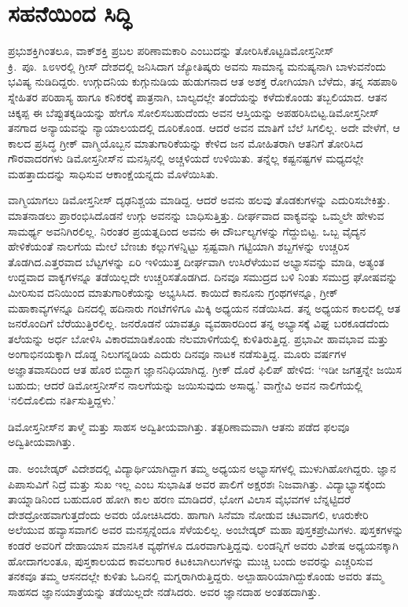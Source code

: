 \section*{ಸಹನೆಯಿಂದ ಸಿದ್ಧಿ}


ಪ್ರಭುಶಕ್ತಿಗಿಂತಲೂ, ವಾಕ್​ಶಕ್ತಿ ಪ್ರಬಲ ಪರಿಣಾಮಕಾರಿ ಎಂಬುದನ್ನು ತೋರಿಸಿಕೊಟ್ಟ\break ಡಿಮೋಸ್ತನೀಸ್ ಕ್ರಿ.\ ಪೂ.\ ೩೮೪ರಲ್ಲಿ ಗ್ರೀಸ್ ದೇಶದಲ್ಲಿ ಜನಿಸಿದಾಗ ಜ್ಯೋತಿಷ್ಕರು ಅವನು ಸಾಮಾನ್ಯ ಮನುಷ್ಯನಾಗಿ ಬಾಳುವನೆಂದು ಭವಿಷ್ಯ ನುಡಿದಿದ್ದರು. ಉಗ್ಗುದನಿಯ ಕುಗ್ಗುನುಡಿಯ ಹುಡುಗನಾದ ಆತ ಅಶಕ್ತ ರೋಗಿಯಾಗಿ ಬೆಳೆದು, ತನ್ನ ಸಹಪಾಠಿ ಸ್ನೇಹಿತರ ಪರಿಹಾಸ್ಯ ಹಾಗೂ ಕನಿಕರಕ್ಕೆ ಪಾತ್ರನಾಗಿ, ಬಾಲ್ಯದಲ್ಲೇ ತಂದೆಯನ್ನು ಕಳೆದುಕೊಂಡು ತಬ್ಬಲಿಯಾದ. ಆತನ ಚಿಕ್ಕಪ್ಪ ಈ ಬೆಪ್ಪುತಕ್ಕಡಿಯನ್ನು ಹೇಗೊ ಸೋಲಿಸಬಹುದೆಂದು ಅವನ ಆಸ್ತಿಯನ್ನು ಅಪಹರಿಸಿಬಿಟ್ಟ.\break ಡಿಮೋಸ್ತನೀಸ್ ತನಗಾದ ಅನ್ಯಾಯವನ್ನು ನ್ಯಾಯಾಲಯದಲ್ಲಿ ದೂರಿಕೊಂಡ. ಆದರೆ ಅವನ ಮಾತಿಗೆ ಬೆಲೆ ಸಿಗಲಿಲ್ಲ. ಅದೇ ವೇಳೆಗೆ, ಆ ಕಾಲದ ಪ್ರಸಿದ್ಧ ಗ್ರೀಕ್ ವಾಗ್ಮಿಯೊಬ್ಬನ ಮಾತುಗಾರಿಕೆಯನ್ನು ಕೇಳಿದ ಜನ ಮೋಹಿತರಾಗಿ ಆತನಿಗೆ ತೋರಿಸಿದ ಗೌರವಾದರಗಳು ಡಿಮೋಸ್ತನೀಸ್​ನ ಮನಸ್ಸಿನಲ್ಲಿ ಅಚ್ಚಳಿಯದೆ ಉಳಿಯಿತು. ತನ್ನೆಲ್ಲ ಕಷ್ಟನಷ್ಟಗಳ ಮಧ್ಯದಲ್ಲೇ ಮಹತ್ತಾದುದನ್ನು ಸಾಧಿಸುವ ಆಕಾಂಕ್ಷೆಯನ್ನದು ಮೊಳೆಯಿಸಿತು.

ವಾಗ್ಮಿಯಾಗಲು ಡಿಮೋಸ್ತನೀಸ್ ದೃಢನಿಶ್ಚಯ ಮಾಡಿದ್ದ. ಆದರೆ ಅವನು ಹಲವು ತೊಡಕುಗಳನ್ನು ಎದುರಿಸಬೇಕಿತ್ತು. ಮಾತನಾಡಲು ಪ್ರಾರಂಭಿಸಿದೊಡನೆ ಉಗ್ಗು ಅವನನ್ನು ಬಾಧಿಸುತ್ತಿತ್ತು. ದೀರ್ಘವಾದ ವಾಕ್ಯವನ್ನು ಒಮ್ಮಲೇ ಹೇಳುವ ಸಾಮರ್ಥ್ಯ ಅವನಿಗಿರಲಿಲ್ಲ. ನಿರಂತರ ಪ್ರಯತ್ನದಿಂದ ಅವನು ಈ ದೌರ್ಬಲ್ಯಗಳನ್ನು ಗೆದ್ದುಬಿಟ್ಟ. ಒಬ್ಬ ವೈದ್ಯನ ಹೇಳಿಕೆಯಂತೆ ನಾಲಗೆಯ ಮೇಲೆ ಬೆಣಚು ಕಲ್ಲುಗಳನ್ನಿಟ್ಟು ಸ್ಪಷ್ಟವಾಗಿ ಗಟ್ಟಿಯಾಗಿ ಶಬ್ದಗಳನ್ನು ಉಚ್ಚರಿಸ ತೊಡಗಿದ.\break ಎತ್ತರವಾದ ಬೆಟ್ಟಗಳನ್ನು ಏರಿ ಇಳಿಯುತ್ತ ದೀರ್ಘವಾಗಿ ಉಸಿರೆಳೆಯುವ ಅಭ್ಯಾಸವನ್ನು ಮಾಡಿ, ಅತ್ಯಂತ ಉದ್ದವಾದ ವಾಕ್ಯಗಳನ್ನೂ ತಡೆಯಿಲ್ಲದೇ ಉಚ್ಚರಿಸತೊಡಗಿದ. ದಿನವೂ ಸಮುದ್ರದ ಬಳಿ ನಿಂತು ಸಮುದ್ರ ಘೋಷವನ್ನು ಮೀರಿಸುವ ದನಿಯಿಂದ ಮಾತುಗಾರಿಕೆಯನ್ನು ಅಭ್ಯಸಿಸಿದ. ಕಾಯಿದೆ ಕಾನೂನು ಗ್ರಂಥಗಳನ್ನೂ, ಗ್ರೀಕ್ ಮಹಾಕಾವ್ಯಗಳನ್ನೂ ದಿನದಲ್ಲಿ ಹದಿನಾರು ಗಂಟೆ\-ಗಳಿಗೂ ಮಿಕ್ಕಿ ಅಧ್ಯಯನ ನಡೆಯಿಸಿದ. ತನ್ನ ಅಧ್ಯಯನ ಕಾಲದಲ್ಲಿ ಆತ ಜನರೊಂದಿಗೆ ಬೆರೆಯುತ್ತಿರಲಿಲ್ಲ. ಜನರೊಡನೆ ಯಾವತ್ತೂ ವ್ಯವಹಾರದಿಂದ ತನ್ನ ಅಭ್ಯಾಸಕ್ಕೆ ವಿಘ್ನ ಬರಕೂಡ\-ದೆಂದು ತಲೆಯನ್ನು ಅರ್ಧ ಬೋಳಿಸಿ ವಿಕಾರಮಾಡಿಕೊಂಡು ನೆಲಮಾಳಿಗೆಯಲ್ಲಿ ಕುಳಿತಿರುತ್ತಿದ್ದ. ಪ್ರಭಾವೀ ಹಾವಭಾವ ಮತ್ತು ಅಂಗಾಭಿನಯಕ್ಕಾಗಿ ದೊಡ್ಡ ನಿಲುಗನ್ನಡಿಯ ಎದುರು ದಿನವೂ ನಾಟಕ ನಡೆಸುತ್ತಿದ್ದ. ಮೂರು ವರ್ಷಗಳ ಅಜ್ಞಾತವಾಸದಿಂದ ಆತ ಹೊರ ಬಿದ್ದಾಗ ಜ್ಞಾನನಿಧಿ\-ಯಾಗಿದ್ದ. ಗ್ರೀಕ್ ದೊರೆ ಫಿಲಿಪ್ ಹೇಳಿದ: ‘ಇಡೀ ಜಗತ್ತನ್ನೇ ಜಯಿಸ ಬಹುದು; ಆದರೆ ಡಿಮೋಸ್ತನೀಸ್​ನ ನಾಲಗೆಯನ್ನು ಜಯಿಸುವುದು ಅಸಾಧ್ಯ.’ ವಾಗ್ದೇವಿ ಅವನ ನಾಲಿಗೆಯಲ್ಲಿ ‘ನಲಿದೊಲಿದು ನರ್ತಿಸುತ್ತಿದ್ದಳು.’

\vskip 1pt

ಡಿಮೋಸ್ತನೀಸ್​ನ ತಾಳ್ಮೆ ಮತ್ತು ಸಾಹಸ ಅದ್ವಿತೀಯವಾಗಿತ್ತು. ತತ್ಪರಿಣಾಮವಾಗಿ ಆತನು ಪಡೆದ ಫಲವೂ ಅದ್ವಿತೀಯವಾಗಿತ್ತು.

\vskip 1pt

ಡಾ.\ ಅಂಬೇಡ್ಕರ್ ವಿದೇಶದಲ್ಲಿ ವಿದ್ಯಾರ್ಥಿಯಾಗಿದ್ದಾಗ ತಮ್ಮ ಅಧ್ಯಯನ ಅಭ್ಯಾಸಗಳಲ್ಲಿ ಮುಳುಗಿಹೋಗಿದ್ದರು. ಜ್ಞಾನ ಪಿಪಾಸುವಿಗೆ ನಿದ್ರೆ ಮತ್ತು ಸುಖ ಇಲ್ಲ ಎಂಬ ಸುಭಾಷಿತ ಅವರ ಪಾಲಿಗೆ ಅಕ್ಷರಶಃ ನಿಜವಾಗಿತ್ತು. ವಿದ್ಯಾಭ್ಯಾಸಕ್ಕೆಂದು ತಾಯ್ನಾಡಿನಿಂದ ಬಹುದೂರ ಹೋಗಿ ಕಾಲ ಹರಣ ಮಾಡಿದರೆ, ಭೋಗ ವಿಲಾಸ ವೈಭವಗಳ ಬೆನ್ನಟ್ಟಿದರೆ ದೇಶದ್ರೋಹವಾಗುತ್ತದೆಂದು ಅವರು ಯೋಚಿಸಿದರು. ಹಾಗಾಗಿ ಸಿನೆಮಾ ನೋಡುವ ಚಟವಾಗಲಿ, ಊರುಕೇರಿ ಅಲೆಯುವ ಹವ್ಯಾಸವಾಗಲಿ ಅವರ ಮನಸ್ಸನ್ನೆಂದೂ ಸೆಳೆಯಲಿಲ್ಲ. ಅಂಬೇಡ್ಕರ್ ಮಹಾ ಪುಸ್ತಕಪ್ರೇಮಿಗಳು. ಪುಸ್ತಕಗಳನ್ನು ಕಂಡರೆ ಅವರಿಗೆ ದೇಹಾಯಾಸ ಮಾನಸಿಕ ವ್ಯಥೆಗಳೂ ದೂರವಾಗುತ್ತಿದ್ದವು. ಲಂಡನ್ನಿಗೆ ಅವರು ವಿಶೇಷ ಅಧ್ಯಯನಕ್ಕಾಗಿ ಹೋದಾಗಲಂತೂ, ಪುಸ್ತಕಾಲಯದ ಕಾವಲುಗಾರ ಕಿಟಕಿಬಾಗಿಲುಗಳನ್ನು ಮುಚ್ಚಿ ಬಂದು ಅವರನ್ನು ಎಚ್ಚರಿಸುವ ತನಕವೂ ತಮ್ಮ ಆಸನದಲ್ಲೇ ಕುಳಿತು ಓದಿನಲ್ಲಿ ಮಗ್ನರಾಗಿರುತ್ತಿದ್ದರು. ಅಲ್ಪಾಹಾರಿಯಾಗಿದ್ದುಕೊಂಡು ಅವರು ತಮ್ಮ ಸಾಹಸದ ಜ್ಞಾನಯಾತ್ರೆಯನ್ನು ತಡೆಯಿಲ್ಲದೇ ನಡೆಸಿದರು. ಅವರ ಜ್ಞಾನದಾಹ ಅಂತಹದಾಗಿತ್ತು.

